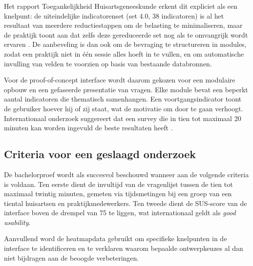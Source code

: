 Het rapport Toegankelijkheid Huisartsgeneeskunde erkent dit expliciet als een knelpunt:
de uiteindelijke indicatorenset (set 4.0, 38 indicatoren) is al het resultaat van meerdere
reductiestappen om de belasting te minimaliseren, maar de praktijk toont aan dat zelfs deze
gereduceerde set nog als te omvangrijk wordt ervaren \autocite{Merckx2023}. De aanbeveling
is dan ook om de bevraging te structureren in modules, zodat een praktijk niet in één sessie
alles hoeft in te vullen, en om automatische invulling van velden te voorzien op basis van
bestaande databronnen.
\medskip

Voor de proof-of-concept interface wordt daarom gekozen voor een modulaire opbouw en
een gefaseerde presentatie van vragen. Elke module bevat een beperkt aantal indicatoren die
thematisch samenhangen. Een voortgangsindicator toont de gebruiker hoever hij of zij staat,
wat de motivatie om door te gaan verhoogt. Internationaal onderzoek suggereert dat een
survey die in tien tot maximaal 20 minuten kan worden ingevuld de beste resultaten heeft \autocite{Revilla2017}.

\subsection{Criteria voor een geslaagd onderzoek}
\label{subsec:slagen-onderzoek}

De bachelorproef wordt als succesvol beschouwd wanneer aan de volgende criteria is voldaan.
Ten eerste dient de invultijd van de vragenlijst tussen de tien tot maximaal twintig minuten, gemeten via tijdsmetingen bij een groep van een tiental huisartsen en praktijkmedewerkers. 
Ten tweede dient de SUS-score van de interface boven de drempel van 75 te liggen, 
wat internationaal geldt als \textit{good usability}.
\medskip

Aanvullend word de heatmapdata gebruikt om specifieke knelpunten in de interface te identificeren en te verklaren waarom bepaalde ontwerpkeuzes al dan niet bijdragen aan de beoogde verbeteringen.